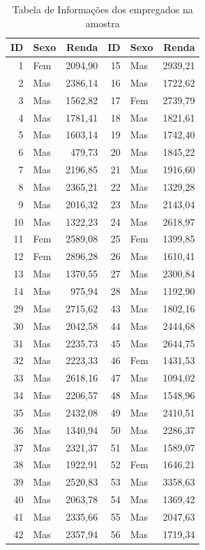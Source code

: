 \documentclass[a4paper,12pt,oneside,twocolumn]{Config/milktest}
\begin{document}
{\small \begin{table}[!htp]
\centering
\begin{tabular}{rlr|rlr}
  \hline
ID & Sexo & Renda & ID & Sexo & Renda \\ 
  \hline
    1 & Fem & 2094,90 &   15 & Mas & 2939,21 \\
    2 & Mas & 2386,14 &   16 & Mas & 1722,62 \\
    3 & Mas & 1562,82 &   17 & Fem & 2739,79 \\
    4 & Mas & 1781,41 &   18 & Mas & 1821,61 \\
    5 & Mas & 1603,14 &   19 & Mas & 1742,40 \\
    6 & Mas &  479,73 &   20 & Mas & 1845,22 \\
    7 & Mas & 2196,85 &   21 & Mas & 1916,60 \\
    8 & Mas & 2365,21 &   22 & Mas & 1329,28 \\
    9 & Mas & 2016,32 &   23 & Mas & 2143,04 \\
   10 & Mas & 1322,23 &   24 & Mas & 2618,97 \\
   11 & Fem & 2589,08 &   25 & Fem & 1399,85 \\
   12 & Fem & 2896,28 &   26 & Mas & 1610,41 \\
   13 & Mas & 1370,55 &   27 & Mas & 2300,84 \\
   14 & Mas &  975,94 &   28 & Mas & 1192,90 \\ \hline   
   29 & Mas & 2715,62 &   43 & Mas & 1802,16 \\
   30 & Mas & 2042,58 &   44 & Mas & 2444,68 \\
   31 & Mas & 2235,73 &   45 & Mas & 2644,75 \\
   32 & Mas & 2223,33 &   46 & Fem & 1431,53 \\
   33 & Mas & 2618,16 &   47 & Mas & 1094,02 \\
   34 & Mas & 2206,57 &   48 & Mas & 1548,96 \\
   35 & Mas & 2432,08 &   49 & Mas & 2410,51 \\
   36 & Mas & 1340,94 &   50 & Mas & 2286,37 \\
   37 & Mas & 2321,37 &   51 & Mas & 1589,07 \\
   38 & Mas & 1922,91 &   52 & Fem & 1646,21 \\
   39 & Mas & 2520,83 &   53 & Mas & 3358,63 \\
   40 & Mas & 2063,78 &   54 & Mas & 1369,42 \\
   41 & Mas & 2335,66 &   55 & Mas & 2047,63 \\
   42 & Mas & 2357,94 &   56 & Mas & 1719,34 \\
   \hline
\end{tabular}
\caption{Tabela de Informações dos empregados na amostra} 
\label{ID:Renda}
\end{table}
}
\end{document}
